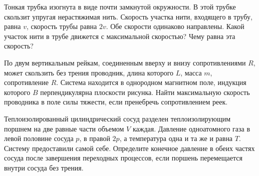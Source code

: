 \AddProb Тонкая трубка изогнута в виде почти замкнутой окружности. В этой трубке скользит упругая нерастяжимая нить. 
Скорость участка нити, входящего в трубу, равна $v$, скорость трубы равна $2v$. Обе скорости одинаково направлены. 
Какой участок нити в трубе движется с максимальной скоростью? Чему равна эта скорость?

\AddProb По двум вертикальным рейкам, соединенным вверху и внизу сопротивлениями $R$, может скользить без трения проводник, 
длина которого $L$, масса $m$, сопротивление $R$. Система находится в однородном магнитном поле, индукция которого $B$ перпендикулярна плоскости рисунка. 
Найти максимальную скорость проводника в поле силы тяжести, если пренебречь сопротивлением реек.

\AddProb Теплоизолированный цилиндрический сосуд разделен теплоизолирующим поршнем на две равные части объемом $V$ каждая. 
Давление одноатомного газа в левой половине сосуда $p$, в правой $2p$, а температура одна и та же и равна $T$. Систему предоставили самой себе. 
Определите конечное давление в обеих частях сосуда после завершения переходных процессов, если поршень перемещается внутри сосуда без трения.